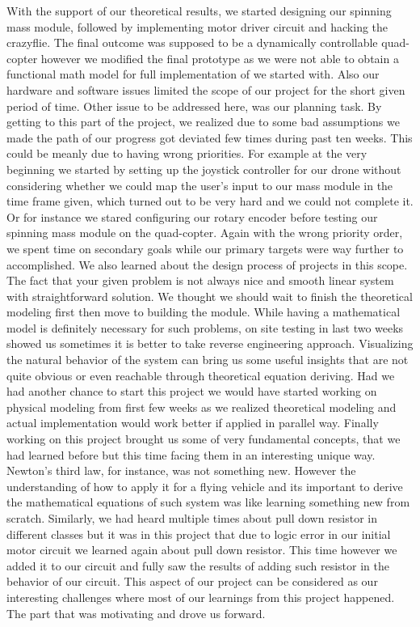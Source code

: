 With the support of our theoretical results, we started designing our spinning mass module, followed by implementing motor driver circuit and hacking the crazyflie.
 The final outcome was supposed to be a dynamically controllable quad-copter however we modified the final prototype as we were not able to obtain a functional math model for full implementation of we started with. Also our hardware and software issues limited the scope of our project for the short given period of time.
 \newline
 Other issue to be addressed here, was our planning task. By getting to this part of the project,
 we realized due to some bad assumptions we made the path of our progress got deviated few times during past ten weeks. This could be meanly due to having wrong priorities. For example at the very beginning we started by setting up the joystick controller for our drone without considering whether we could map the user's input to our mass module in the time frame given, which turned out to be very hard and we could not complete it. Or for instance we stared configuring our rotary encoder before testing our spinning mass module on the quad-copter. Again with the wrong priority order, we spent time on secondary goals while our primary targets were way further to accomplished. We also learned about the design process of projects in this scope. The fact that your given problem is not always nice and smooth linear system with straightforward solution. We thought we should wait to finish the theoretical modeling first then move to building the module. While having a mathematical model is definitely necessary for such problems, on site testing in last two weeks showed us sometimes it is better to take reverse engineering approach. Visualizing
 the natural behavior of the system can bring us some useful insights that are not quite obvious or even reachable through theoretical equation deriving. Had we had another chance to start this project we would have started working on physical modeling from first few weeks as we realized theoretical modeling and actual implementation would work better if applied in parallel way. 
 \newline
 Finally working on this project brought us some of very fundamental concepts, that we had learned before but this time facing them in an interesting unique way. Newton's third law, for instance, was not something new. However the understanding of how to apply it for a flying vehicle and its important to derive the mathematical equations of such system was like learning something new from scratch. Similarly, we had heard multiple times about pull down resistor in different classes but it was in this project that due to logic error in our initial motor circuit we learned again about pull down resistor. This time however we added it to our circuit and fully saw the results of adding such resistor in the behavior of our circuit. This aspect of our project can be considered as our interesting challenges where most of our learnings from this project happened. The part that was motivating and drove us forward.      
 
